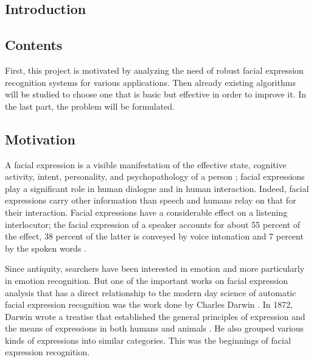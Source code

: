   \begin{titlepage}
    \vspace*{\fill}
      \part{Introduction}
    \vspace*{\fill}
  \end{titlepage}

\chapter*{Contents}

First, this project is motivated by analyzing the need of robust facial expression recognition systems for various applications. Then already existing algorithms will be studied to choose one that is basic but effective in order to improve it. In the last part, the problem will be formulated.
\pagebreak

\chapter{Motivation}

A facial expression is a visible manifestation of the effective state, cognitive activity, intent, personality, and psychopathology of a person \cite{DON99}; facial expressions play a significant role in human dialogue and in human interaction. Indeed, facial expressions carry other information than speech and humans relay on that for their interaction. Facial expressions have a considerable effect on a listening interlocutor; the facial expression of a speaker accounts for about 55 percent of the effect, 38 percent of the latter is conveyed by voice intonation and 7 percent by the spoken words \cite{PAN00}.
\newline

\noindent Since antiquity, searchers have been interested in emotion and more particularly in emotion recognition. But one of the important works on facial expression analysis that has a direct relationship to the modern day science of automatic facial expression recognition was the work done by Charles Darwin \cite{BET12}. In 1872, Darwin wrote a treatise that established the general principles of expression and the means of expressions in both humans and animals \cite{DAR04}. He also grouped various kinds of expressions into similar categories. This was the beginnings of facial expression recognition.
\newline

